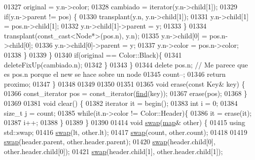 \begin{DoxyCode}
01327                     original = y.n->color;
01328                     cambiado = iterator(y.n->child[1]);
01329                     \textcolor{keywordflow}{if}(y.n->parent != pos) \{
01330                         transplant(y.n, y.n->child[1]);
01331                         y.n->child[1] = pos.n->child[1];
01332                         y.n->child[1]->parent = y;
01333                     \}
01334                     transplant(const\_cast<Node*>(pos.n), y.n);
01335                     y.n->child[0] = pos.n->child[0];
01336                     y.n->child[0]->parent = y;
01337                     y.n->color = pos.n->color;
01338                 \}
01339             \}
01340             \textcolor{keywordflow}{if}(original == Color::Black)\{
01341                 deleteFixUp(cambiado.n);
01342             \}
01343         \}
01344         \textcolor{keyword}{delete} pos.n; \textcolor{comment}{// Me parece que es pos.n porque el new se hace sobre un node}
01345         count--;
01346         \textcolor{keywordflow}{return} proximo;
01347     \}
01348 
01349 
01350 
01351 
01365     \textcolor{keywordtype}{void} erase(\textcolor{keyword}{const} Key& key) \{
01366         const\_iterator pos = const\_iterator(\hyperlink{classaed2_1_1map_afd0fc1a8234888e61e0e615de7e245b8_afd0fc1a8234888e61e0e615de7e245b8}{find}(key));
01367         erase(pos);
01368     \}
01369 
01381     \textcolor{keywordtype}{void} clear() \{
01382         iterator it = begin();
01383         \textcolor{keywordtype}{int} i = 0;
01384         \textcolor{keywordtype}{size\_t} j = count;
01385         \textcolor{keywordflow}{while}(it.n->color != Color::Header)\{
01386             it = erase(it);
01387             i++;
01388         \}
01389     \}
01390 
01414     \textcolor{keywordtype}{void} \hyperlink{classaed2_1_1map_a119cb2938bbc11c25ebd4fb824782a72_a119cb2938bbc11c25ebd4fb824782a72}{swap}(\hyperlink{classaed2_1_1map}{map}& other) \{
01415         \textcolor{keyword}{using} std::swap;
01416         \hyperlink{classaed2_1_1map_a119cb2938bbc11c25ebd4fb824782a72_a119cb2938bbc11c25ebd4fb824782a72}{swap}(lt, other.lt);
01417         \hyperlink{classaed2_1_1map_a119cb2938bbc11c25ebd4fb824782a72_a119cb2938bbc11c25ebd4fb824782a72}{swap}(count, other.count);
01418 
01419         \hyperlink{classaed2_1_1map_a119cb2938bbc11c25ebd4fb824782a72_a119cb2938bbc11c25ebd4fb824782a72}{swap}(header.parent, other.header.parent);
01420         \hyperlink{classaed2_1_1map_a119cb2938bbc11c25ebd4fb824782a72_a119cb2938bbc11c25ebd4fb824782a72}{swap}(header.child[0], other.header.child[0]);
01421         \hyperlink{classaed2_1_1map_a119cb2938bbc11c25ebd4fb824782a72_a119cb2938bbc11c25ebd4fb824782a72}{swap}(header.child[1], other.header.child[1]);

\end{DoxyCode}
